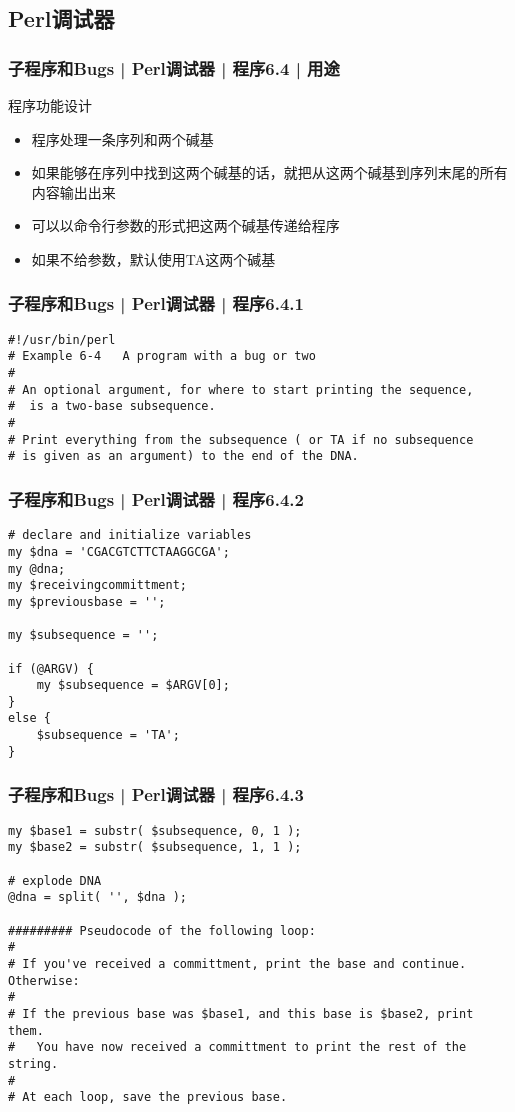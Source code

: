 \subsection{Perl调试器}
\begin{frame}[fragile]
  \frametitle{子程序和Bugs | Perl调试器 | 程序6.4 | 用途}
  \begin{block}{程序功能设计}
  \begin{itemize}
    \item 程序处理一条序列和两个碱基
    \item 如果能够在序列中找到这两个碱基的话，就把从这两个碱基到序列末尾的所有内容输出出来
    \item 可以以命令行参数的形式把这两个碱基传递给程序
    \item 如果不给参数，默认使用TA这两个碱基
  \end{itemize}
  \end{block}
\end{frame}

\begin{frame}[fragile]
  \frametitle{子程序和Bugs | Perl调试器 | 程序6.4.1}
\begin{lstlisting}[firstnumber=1]
#!/usr/bin/perl
# Example 6-4   A program with a bug or two
#
# An optional argument, for where to start printing the sequence,
#  is a two-base subsequence.
#
# Print everything from the subsequence ( or TA if no subsequence
# is given as an argument) to the end of the DNA.
\end{lstlisting}
\end{frame}

\begin{frame}[fragile]
  \frametitle{子程序和Bugs | Perl调试器 | 程序6.4.2}
\begin{lstlisting}[firstnumber=10]
# declare and initialize variables
my $dna = 'CGACGTCTTCTAAGGCGA';
my @dna;
my $receivingcommittment;
my $previousbase = '';

my $subsequence = '';

if (@ARGV) {
    my $subsequence = $ARGV[0];
}
else {
    $subsequence = 'TA';
}
\end{lstlisting}
\end{frame}

\begin{frame}[fragile]
  \frametitle{子程序和Bugs | Perl调试器 | 程序6.4.3}
\begin{lstlisting}[firstnumber=25,basicstyle=\small\tt]
my $base1 = substr( $subsequence, 0, 1 );
my $base2 = substr( $subsequence, 1, 1 );

# explode DNA
@dna = split( '', $dna );

######### Pseudocode of the following loop:
#
# If you've received a committment, print the base and continue.  Otherwise:
#
# If the previous base was $base1, and this base is $base2, print them.
#   You have now received a committment to print the rest of the string.
#
# At each loop, save the previous base.
\end{lstlisting}
\end{frame}

